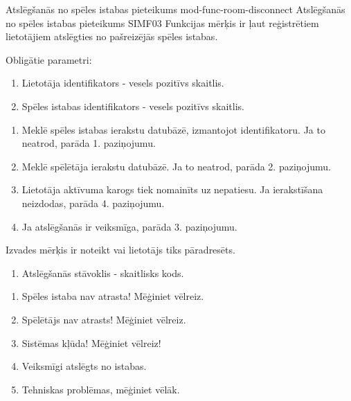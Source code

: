 \moduleFunctionTable
{Atslēgšanās no spēles istabas pieteikums}
{mod-func-room-disconnect}
{Atslēgšanās no spēles istabas pieteikums}
{SIMF03}
{
	Funkcijas mērķis ir ļaut reģistrētiem lietotājiem atslēgties no pašreizējās spēles istabas.
}
{
	Obligātie parametri:
	\begin{enumerate}
		\item Lietotāja identifikators - vesels pozitīvs skaitlis.
		\item Spēles istabas identifikators - vesels pozitīvs skaitlis.
	\end{enumerate}
}
{
	\begin{enumerate}
		\item Meklē spēles istabas ierakstu datubāzē, izmantojot identifikatoru.
		      Ja to neatrod, parāda 1. paziņojumu.
		\item Meklē spēlētāja ierakstu datubāzē.
		      Ja to neatrod, parāda 2. paziņojumu.
		\item Lietotāja aktīvuma karogs tiek nomainīts uz nepatiesu.
		      Ja ierakstīšana neizdodas, parāda 4. paziņojumu.
		\item Ja atslēgšanās ir veiksmīga, parāda 3. paziņojumu.
	\end{enumerate}
}
{
	Izvades mērķis ir noteikt vai lietotājs tiks pāradresēts.
	\begin{enumerate}
		\item Atslēgšanās stāvoklis - skaitlisks kods.
	\end{enumerate}
}
{
	\begin{enumerate}
		\item Spēles istaba nav atrasta! Mēģiniet vēlreiz.
		\item Spēlētājs nav atrasts! Mēģiniet vēlreiz.
		\item Sistēmas kļūda! Mēģiniet vēlreiz!
		\item Veiksmīgi atslēgts no istabas.
		\item Tehniskas problēmas, mēģiniet vēlāk.
	\end{enumerate}
}
